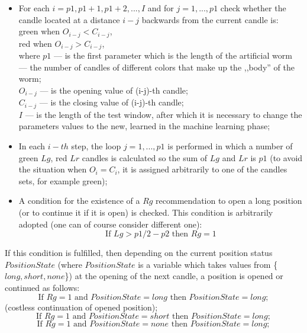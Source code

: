 \documentclass[runningheads,a4paper]{llncs}
\begin{document}
\begin{itemize}
\item For each $i = p1, p1 +1, p1 +2, ..., I$ and for $j = 1, ..., p1$ check whether the candle located at a distance $i-j$ backwards from the current candle is:\\
green when $O_{i-j} <C_{i-j}$, \\
red when $O_{i-j}> C_{i-j}$, \\
where $p1$ --- is the first parameter which is the length of the artificial worm --- the number of candles of different colors that make up the ,,body'' of the worm; \\
$O_{i-j}$ --- is the opening value of (i-j)-th candle;\\ 
$C_{i-j}$ --- is the closing value of (i-j)-th candle; \\
$I$ --- is the length of the test window, after which it is necessary to change the parameters values to the new, learned in the machine learning phase;\\
\item In each $i-th$ step, the loop $j = 1, ..., p1$ is performed in which a number of green $Lg$, red $Lr$ candles is calculated so the sum of $Lg$ and $Lr$ is $p1$ (to avoid the situation when $O_i = C_i$, it is assigned arbitrarily to one of the candles sets, for example green);
\item A condition for the existence of a $Rg$ recommendation to open a long position (or to continue it if it is open) is checked. This condition is arbitrarily adopted (one can of course consider different one): 
\begin{equation}
\text{If } Lg> p1/2-p2 \text{ then } Rg=1
\end{equation}  
                                                     
\end{itemize}
If this condition is fulfilled, then depending on the current position status $PositionState$ (where $PositionState$ is a variable which takes values from \{$long, short, none$\}) at the opening of the next candle, a position is opened or continued as follows: 
\begin{equation}
\text{If } Rg=1 \text{ and } PositionState =long \text{ then }PositionState =long;
\end{equation}
(costless continuation of opened position);
\begin{equation}
\text{If } Rg=1 \text{ and } PositionState = short \text{ then } PositionState=long;
\end{equation}
\begin{equation}
\text{If } Rg=1 \text{ and } PositionState =none \text{ then } PositionState =long;
\end{equation}
\end{document}
